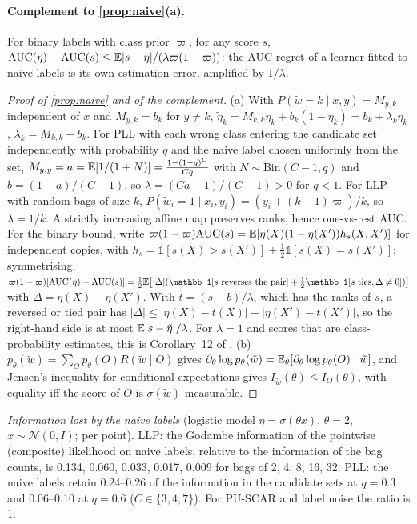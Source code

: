 \paragraph{Complement to \cref{prop:naive}(a).} For binary labels with class prior $\varpi$, for any score $s$,
$\mathrm{AUC}(\eta)-\mathrm{AUC}(s)\le\mathbb{E}\lvert s-\tilde\eta\rvert/(\lambda\varpi(1-\varpi))$: the AUC regret of a learner fitted
to naive labels is its own estimation error, amplified by $1/\lambda$.
\begin{proof}[Proof of \cref{prop:naive} and of the complement]
(a) With $P(\tilde w=k\mid x,y)=M_{y,k}$ independent of $x$ and $M_{y,k}=b_k$ for $y\neq k$,
$\tilde\eta_k=M_{k,k}\eta_k+b_k(1-\eta_k)=b_k+\lambda_k\eta_k$, $\lambda_k=M_{k,k}-b_k$. For PLL with each wrong class
entering the candidate set independently with probability $q$ and the naive label chosen uniformly from the set,
$M_{y,y}=a=\mathbb{E}[1/(1+N)]=\frac{1-(1-q)^C}{Cq}$ with $N\sim\mathrm{Bin}(C-1,q)$ and $b=(1-a)/(C-1)$, so $\lambda=(Ca-1)/(C-1)>0$
for $q<1$. For LLP with random bags of size $k$, $P(\tilde w_i=1\mid x_i,y_i)=(y_i+(k-1)\varpi)/k$, so $\lambda=1/k$.
A strictly increasing affine map preserves ranks, hence one-vs-rest AUC. For the binary bound, write
$\varpi(1-\varpi)\mathrm{AUC}(s)=\mathbb{E}[\eta(X)(1-\eta(X'))h_s(X,X')]$ for independent copies, with
$h_s=\mathbb 1[s(X)>s(X')]+\frac12\mathbb 1[s(X)=s(X')]$; symmetrising,
$\varpi(1-\varpi)[\mathrm{AUC}(\eta)-\mathrm{AUC}(s)]=\frac12\E\big[\lvert\Delta\rvert(\mathbb 1[s\text{ reverses the pair}]+\frac12\mathbb 1[s\text{ ties},\Delta\neq0])\big]$
with $\Delta=\eta(X)-\eta(X')$. With $t=(s-b)/\lambda$, which has the ranks of $s$, a reversed or tied pair has
$\lvert\Delta\rvert\le\lvert\eta(X)-t(X)\rvert+\lvert\eta(X')-t(X')\rvert$, so the right-hand side is at most
$\mathbb{E}\lvert s-\tilde\eta\rvert/\lambda$. For $\lambda=1$ and scores that are class-probability estimates, this is Corollary~12 of \citet{agarwal2014}.
(b) $p_\theta(\tilde w)=\sum_Op_\theta(O)R(\tilde w\mid O)$ gives
$\partial_\theta\log p_\theta(\tilde w)=\mathbb{E}_\theta[\partial_\theta\log p_\theta(O)\mid\tilde w]$, and Jensen's inequality for
conditional expectations gives $I_{\tilde w}(\theta)\le I_O(\theta)$, with equality iff the score of $O$ is
$\sigma(\tilde w)$-measurable.
\end{proof}
\emph{Information lost by the naive labels} (logistic model $\eta=\sigma(\theta x)$, $\theta=2$, $x\sim\mathcal N(0,I)$; per
point). LLP: the Godambe information of the pointwise (composite) likelihood on naive labels, relative to the
information of the bag counts, is 0.134, 0.060, 0.033, 0.017, 0.009 for bags of 2, 4, 8, 16, 32. PLL: the naive labels
retain 0.24--0.26 of the information in the candidate sets at $q=0.3$ and 0.06--0.10 at $q=0.6$ ($C\in\{3,4,7\}$).
For PU-SCAR and label noise the ratio is 1.
